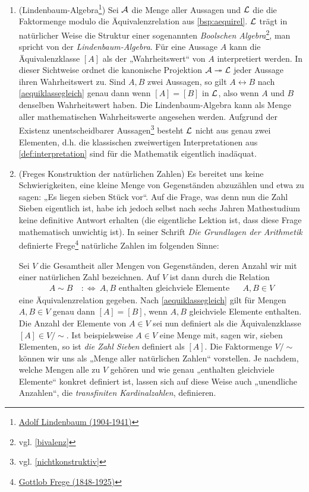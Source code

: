 \begin{bsp} \label{bsp:lindenbaum} \quad
    \begin{enumerate}
        \item(Lindenbaum-Algebra\footnote{\href{https://de.wikipedia.org/wiki/Adolf_Lindenbaum}{Adolf Lindenbaum (1904-1941)}}) Sei $\mathcal A$ die Menge aller Aussagen und $\mathcal L$ die die Faktormenge modulo die Äquivalenzrelation aus \cref{bsp:aequirel}. $\mathcal L$ trägt in natürlicher Weise die Struktur einer sogenannten \emph{Boolschen Algebra}\footnote{vgl. \cref{bivalenz}}, man spricht von der \emph{Lindenbaum-Algebra}. Für eine Aussage $A$ kann die Äquivalenzklasse $[A]$ als der „Wahrheitswert“ von $A$ interpretiert werden. In dieser Sichtweise ordnet die kanonische Projektion $\mathcal A\twoheadrightarrow \mathcal L$ jeder Aussage ihren Wahrheitswert zu. Sind $A,B$ zwei Aussagen, so gilt $A\leftrightarrow B$ nach \cref{aequiklassegleich} genau dann wenn $[A]=[B]$ in $\mathcal L$, also wenn $A$ und $B$ denselben Wahrheitswert haben. Die Lindenbaum-Algebra kann als Menge aller mathematischen Wahrheitswerte angesehen werden. Aufgrund der Existenz unentscheidbarer Aussagen\footnote{vgl. \cref{nichtkonstruktiv}} besteht $\mathcal L$ nicht aus genau zwei Elementen, d.h. die klassischen zweiwertigen Interpretationen aus \cref{def:interpretation} sind für die Mathematik eigentlich inadäquat.

        \item(Freges Konstruktion der natürlichen Zahlen) Es bereitet uns keine Schwierigkeiten, eine kleine Menge von Gegenständen abzuzählen und etwa zu sagen: „Es liegen sieben Stück vor“. Auf die Frage, was denn nun die Zahl Sieben eigentlich ist, habe ich jedoch selbst nach sechs Jahren Mathestudium keine definitive Antwort erhalten (die eigentliche Lektion ist, dass diese Frage mathematisch unwichtig ist). In seiner Schrift \emph{Die Grundlagen der Arithmetik} definierte Frege\footnote{\href{https://de.wikipedia.org/wiki/Gottlob_Frege}{Gottlob Frege (1848-1925)}} natürliche Zahlen im folgenden Sinne:

        Sei $V$ die Gesamtheit aller Mengen von Gegenständen, deren Anzahl wir mit einer natürlichen Zahl bezeichnen. Auf $V$ ist dann durch die Relation
        \begin{align*}
            A\sim B \ &:\Leftrightarrow\ \text{$A,B$ enthalten gleichviele Elemente} && A,B\in V
        \end{align*}
        eine Äquivalenzrelation gegeben. Nach \cref{aequiklassegleich} gilt für Mengen $A,B\in V$ genau dann $[A]=[B]$, wenn $A,B$ gleichviele Elemente enthalten. Die Anzahl der Elemente von $A\in V$ sei nun definiert als die Äquivalenzklasse $[A]\in V/{\sim}$. Ist beispielsweise $A\in V$ eine Menge mit, sagen wir, sieben Elementen, so ist \emph{die Zahl Sieben} definiert als $[A]$. Die Faktormenge $V/{\sim}$ können wir uns als „Menge aller natürlichen Zahlen“ vorstellen. Je nachdem, welche Mengen alle zu $V$ gehören und wie genau „enthalten gleichviele Elemente“ konkret definiert ist, lassen sich auf diese Weise auch „unendliche Anzahlen“, die \emph{transfiniten Kardinalzahlen}, definieren.
    \end{enumerate}
\end{bsp}


